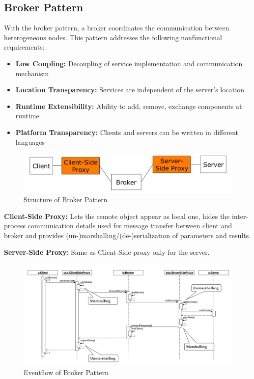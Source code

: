 \subsection{Broker Pattern}
With the broker pattern, a broker coordinates the communication between heterogeneous nodes. This pattern addresses the following nonfunctional requirements:
\begin{itemize}[noitemsep]
  \item \textbf{Low Coupling:} Decoupling of service implementation and communication mechanism
  \item \textbf{Location Transparency:} Services are independent of the server's location
  \item \textbf{Runtime Extensibility:} Ability to add, remove, exchange components at runtime
  \item \textbf{Platform Transparency:} Clients and servers can be written in different languages
\end{itemize}

\begin{figure}[H]
	\centering
	\includegraphics[width=0.9\linewidth]{images/pattern_broker.png}
	\caption{Structure of Broker Pattern}
\end{figure}

\textbf{Client-Side Proxy:} Lets the remote object appear as local one, hides the inter-process communication details used for message transfer between client and broker and provides (un-)marshalling/(de-)serialization of parameters and results.
\newline

\textbf{Server-Side Proxy:} Same as Client-Side proxy only for the server.

\begin{figure}[H]
	\centering
	\includegraphics[width=\linewidth]{images/eventflow_broker.png}
	\caption{Eventflow of Broker Pattern}
\end{figure}
\newpage

